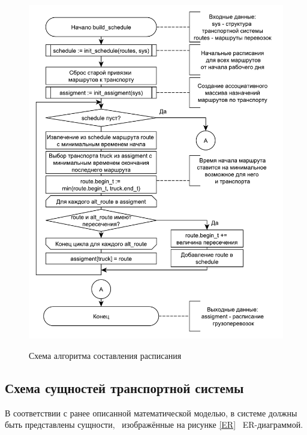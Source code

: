 \begin{figure}[hp]
	\begin{center}
		{\includegraphics[scale=0.7, angle=0, page=1]{img/schedule.pdf}}
		\caption{Схема алгоритма составления расписания}
		\label{alg:schedule}
	\end{center}
\end{figure}

\subsection{Схема сущностей транспортной системы}
В соответствии с ранее описанной математической моделью, в системе должны быть представлены сущности, \, изображённые на рисунке \ref{ER} \, ER-диаграммой.

